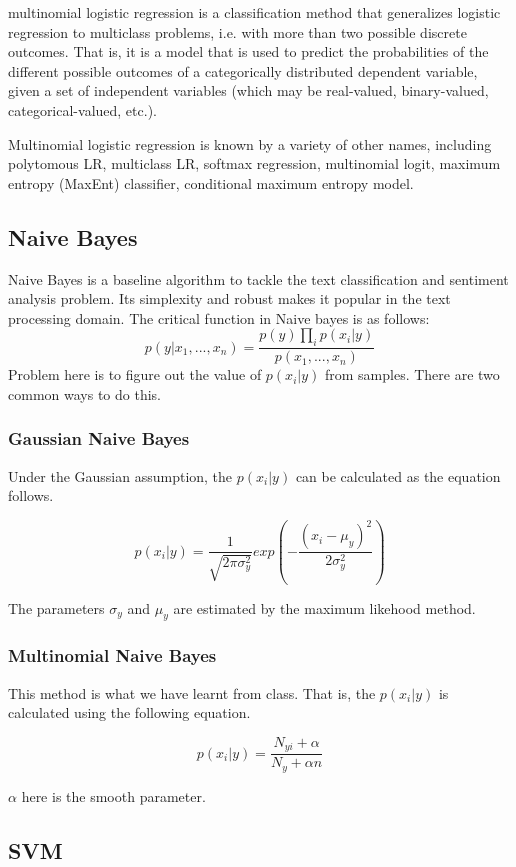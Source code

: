 \documentclass[letterpaper]{article} %
\begin{document}
multinomial logistic regression is a classification method that generalizes logistic regression to multiclass problems, i.e. with more than two possible discrete outcomes. That is, it is a model that is used to predict the probabilities of the different possible outcomes of a categorically distributed dependent variable, given a set of independent variables (which may be real-valued, binary-valued, categorical-valued, etc.).

Multinomial logistic regression is known by a variety of other names, including polytomous LR, multiclass LR, softmax regression, multinomial logit, maximum entropy (MaxEnt) classifier, conditional maximum entropy model.

\subsection{Naive Bayes}

Naive Bayes is a baseline algorithm to tackle the text classification and sentiment analysis problem. Its simplexity and robust makes it popular in the text processing domain. The critical function in Naive bayes is as follows: \cite{pedregosa2011scikit}
$$p(y|x_1,...,x_n) = \frac{p(y)\prod_i p(x_i|y)}{p(x_1,...,x_n)}$$
Problem here is to figure out the value of $p(x_i|y)$ from samples. There are two common ways to do this.
\subsubsection{Gaussian Naive Bayes}

Under the Gaussian assumption, the $p(x_i|y)$ can be calculated as the equation follows.

$$p(x_i|y) = \frac{1}{\sqrt{2\pi \sigma_y^2}}exp(-\frac{(x_i-\mu_y)^2}{2\sigma_y^2})$$

The parameters $\sigma_y$ and $\mu_y$ are estimated by the maximum likehood method.

\subsubsection{Multinomial Naive Bayes}

This method is what we have learnt from class. That is, the $p(x_i|y)$ is calculated using the following equation.

$$p(x_i|y)=\frac{N_{yi}+\alpha}{N_y+\alpha n}$$

$\alpha$ here is the smooth parameter.

\subsection{SVM}
\end{document}

